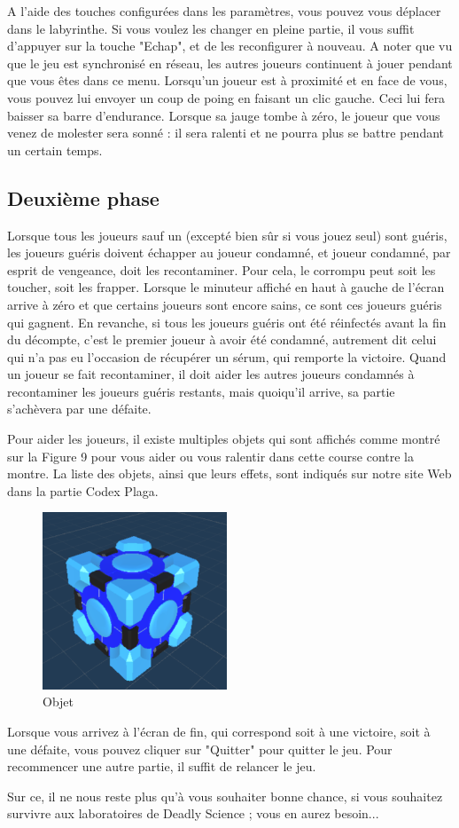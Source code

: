 \documentclass{article}
\begin{document}
A l'aide des touches configurées dans les paramètres, vous pouvez vous déplacer dans le labyrinthe. Si vous voulez les changer en pleine partie, il vous suffit d'appuyer sur la touche "Echap", et de les reconfigurer à nouveau. A noter que vu que le jeu est synchronisé en réseau, les autres joueurs continuent à jouer pendant que vous êtes dans ce menu. Lorsqu'un joueur est à proximité et en face de vous, vous pouvez lui envoyer un coup de poing en faisant un clic gauche. Ceci lui fera baisser sa barre d'endurance. Lorsque sa jauge tombe à zéro, le joueur que vous venez de molester sera sonné : il sera ralenti et ne pourra plus se battre pendant un certain temps.

\subsection{Deuxième phase}

Lorsque tous les joueurs sauf un (excepté bien sûr si vous jouez seul) sont guéris, les joueurs guéris doivent échapper au joueur condamné, et joueur condamné, par esprit de vengeance, doit les recontaminer. Pour cela, le corrompu peut soit les toucher, soit les frapper. Lorsque le minuteur affiché en haut à gauche de l'écran arrive à zéro et que certains joueurs sont encore sains, ce sont ces joueurs guéris qui gagnent. En revanche, si tous les joueurs guéris ont été réinfectés avant la fin du décompte, c'est le premier joueur à avoir été condamné, autrement dit celui qui n'a pas eu l'occasion de récupérer un sérum, qui remporte la victoire. Quand un joueur se fait recontaminer, il doit aider les autres joueurs condamnés à recontaminer les joueurs guéris restants, mais quoiqu'il arrive, sa partie s'achèvera par une défaite.

Pour aider les joueurs, il existe multiples objets qui sont affichés comme montré sur la Figure 9 pour vous aider ou vous ralentir dans cette course contre la montre. La liste des objets, ainsi que leurs effets, sont indiqués sur notre site Web dans la partie Codex Plaga.

\begin{figure}[H]
	\centering
	\includegraphics[width=0.49\textwidth]{Objet.png}
	\caption{Objet}
	\label{Objet}
\end{figure}

Lorsque vous arrivez à l'écran de fin, qui correspond soit à une victoire, soit à une défaite, vous pouvez cliquer sur "Quitter" pour quitter le jeu. Pour recommencer une autre partie, il suffit de relancer le jeu.

Sur ce, il ne nous reste plus qu'à vous souhaiter bonne chance, si vous souhaitez survivre aux laboratoires de Deadly Science ; vous en aurez besoin...
\end{document}
